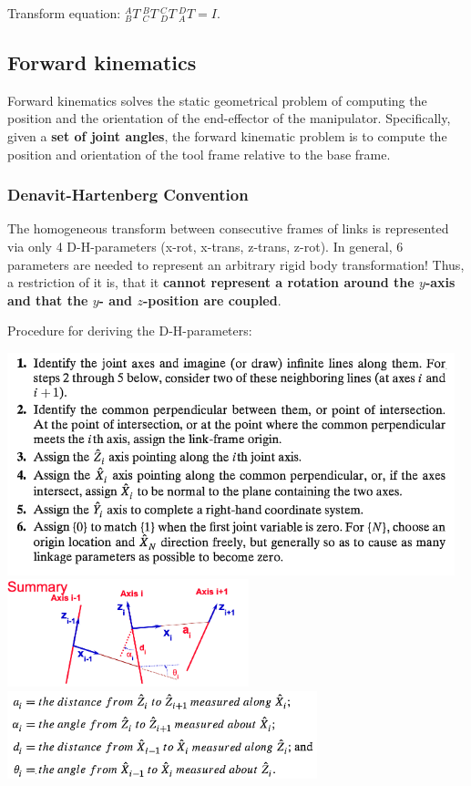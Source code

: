 Transform equation: ${}_{B}^{A}T \ {}_{C}^{B}T \ {}_{D}^{C}T \ {}_{A}^{D}T= I$.

\subsection{Forward kinematics}
Forward kinematics solves the static geometrical problem of computing the position and the orientation of the end-effector of the manipulator. Specifically, given a \textbf{set of joint angles}, the forward kinematic problem is to compute the position and orientation of the tool frame relative to the base frame.

\subsubsection{Denavit-Hartenberg Convention}
The homogeneous transform between consecutive frames of links is represented via only 4 D-H-parameters (x-rot, x-trans, z-trans, z-rot). In general, 6 parameters are needed to represent an arbitrary rigid body transformation! Thus, a restriction of it is, that it \textbf{cannot represent a rotation around the $y$-axis and that the $y$- and $z$-position are coupled}.

Procedure for deriving the D-H-parameters:

\begin{center}
	\includegraphics[width=13cm]{sections/imgs/10.png}\\
	\includegraphics[width=7cm]{sections/imgs/2_dh_params.png}
	\includegraphics[width=9cm]{sections/imgs/11.png}
\end{center}

